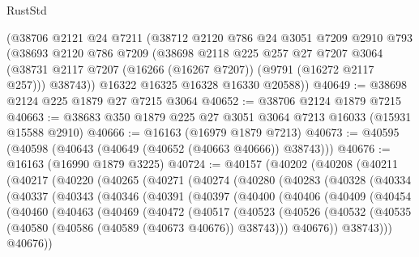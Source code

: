 \begin{lexlean}{RustStd}
\begin{coremodule}
    (@38706
      @2121
      @24
      @7211
      (@38712
        @2120
        @786
        @24
        @3051
        @7209
        @2910
        @793
        (@38693
          @2120
          @786
          @7209
          (@38698
            @2118
            @225
            @257
            @27
            @7207
            @3064
            (@38731 @2117 @7207 (@16266 (@16267 @7207)) (@9791 (@16272 @2117 @257)))
            @38743))
        @16322
        @16325
        @16328
        @16330
        @20588))
@40649 := @38698 @2124 @225 @1879 @27 @7215 @3064
@40652 := @38706 @2124 @1879 @7215
@40663 := @38683 @350 @1879 @225 @27 @3051 @3064 @7213 @16033 (@15931 @15588 @2910)
@40666 := @16163 (@16979 @1879 @7213)
@40673 := @40595 (@40598 (@40643 (@40649 (@40652 (@40663 @40666)) @38743)))
@40676 := @16163 (@16990 @1879 @3225)
@40724 := @40157
    (@40202
      (@40208
        (@40211
          (@40217
            (@40220
              (@40265
                (@40271
                  (@40274
                    (@40280
                      (@40283
                        (@40328
                          (@40334
                            (@40337
                              (@40343
                                (@40346
                                  (@40391
                                    (@40397
                                      (@40400
                                        (@40406
                                          (@40409
                                            (@40454
                                              (@40460
                                                (@40463
                                                  (@40469
                                                    (@40472
                                                      (@40517
                                                        (@40523
                                                          (@40526
                                                            (@40532
                                                              (@40535
                                                                (@40580
                                                                  (@40586
                                                                    (@40589 (@40673 @40676))
                                                                    @38743)))
                                                              @40676))
                                                          @38743)))
                                                    @40676))

\end{coremodule}
\end{lexlean}
